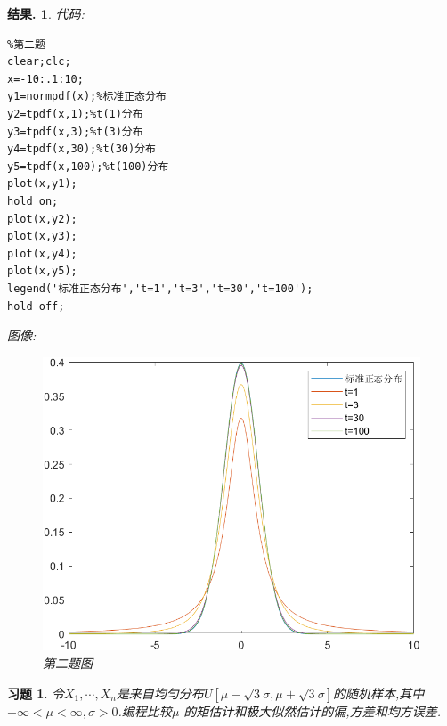 \documentclass[a4paper,oneside,12pt]{ctexart}
\theoremstyle{plain}
\newtheorem{exercise}{习题}
\theoremstyle{nonumberplain}
\newtheorem{solution}{结果.}
\begin{document}
    \begin{solution}
        代码:
        \begin{lstlisting}
%第二题
clear;clc;
x=-10:.1:10;
y1=normpdf(x);%标准正态分布
y2=tpdf(x,1);%t(1)分布
y3=tpdf(x,3);%t(3)分布
y4=tpdf(x,30);%t(30)分布
y5=tpdf(x,100);%t(100)分布
plot(x,y1);
hold on;
plot(x,y2);
plot(x,y3);
plot(x,y4);
plot(x,y5);
legend('标准正态分布','t=1','t=3','t=30','t=100');
hold off;
        \end{lstlisting}
        图像:
        \begin{figure}[H]
            \centering
            \includegraphics[scale=0.7]{第二问.png}
            \caption{第二题图}
        \end{figure}
    \end{solution}

    \begin{exercise}
        \label{ex:3}
        令$X_1,\cdots,X_n$是来自均匀分布$U[\mu-\sqrt{3}\sigma,\mu+\sqrt{3}\sigma]$的随机样本,其中$-\infty <\mu<\infty,\sigma>0$.编程比较$\mu$
        的矩估计和极大似然估计的偏,方差和均方误差.
    \end{exercise}
\end{document}
